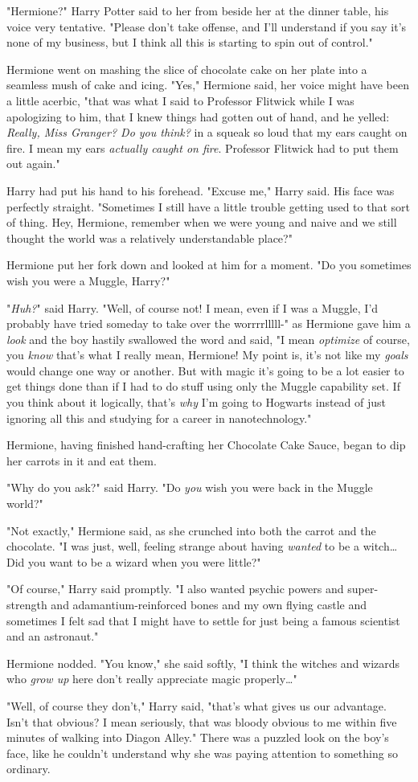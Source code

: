 "Hermione?" Harry Potter said to her from beside her at the dinner table, his 
voice very tentative. "Please don't take offense, and I'll understand if you 
say it's none of my business, but I think all this is starting to spin out of 
control."

Hermione went on mashing the slice of chocolate cake on her plate into a 
seamless mush of cake and icing. "Yes," Hermione said, her voice might have 
been a little acerbic, "that was what I said to Professor Flitwick while I was 
apologizing to him, that I knew things had gotten out of hand, and he yelled: 
\emph{Really, Miss Granger? Do you think?} in a squeak so loud that my ears 
caught on fire. I mean my ears \emph{actually caught on fire}. Professor 
Flitwick had to put them out again."

Harry had put his hand to his forehead. "Excuse me," Harry said. His face was 
perfectly straight. "Sometimes I still have a little trouble getting used to 
that sort of thing. Hey, Hermione, remember when we were young and naive and we 
still thought the world was a relatively understandable place?"

Hermione put her fork down and looked at him for a moment. "Do you sometimes 
wish you were a Muggle, Harry?"

"\emph{Huh?}" said Harry. "Well, of course not! I mean, even if I was a Muggle, 
I'd probably have tried someday to take over the worrrrlllll-" as Hermione gave 
him a \emph{look} and the boy hastily swallowed the word and said, "I mean 
\emph{optimize} of course, you \emph{know} that's what I really mean, Hermione! 
My point is, it's not like my \emph{goals} would change one way or another. But 
with magic it's going to be a lot easier to get things done than if I had to do 
stuff using only the Muggle capability set. If you think about it logically, 
that's \emph{why} I'm going to Hogwarts instead of just ignoring all this and 
studying for a career in nanotechnology."

Hermione, having finished hand-crafting her Chocolate Cake Sauce, began to dip 
her carrots in it and eat them.

"Why do you ask?" said Harry. "Do \emph{you} wish you were back in the Muggle 
world?"

"Not exactly," Hermione said, as she crunched into both the carrot and the 
chocolate. "I was just, well, feeling strange about having \emph{wanted} to be 
a witch{\ldots} Did you want to be a wizard when you were little?"

"Of course," Harry said promptly. "I also wanted psychic powers and 
super-strength and adamantium-reinforced bones and my own flying castle and 
sometimes I felt sad that I might have to settle for just being a famous 
scientist and an astronaut."

Hermione nodded. "You know," she said softly, "I think the witches and wizards 
who \emph{grow up} here don't really appreciate magic properly{\ldots}"

"Well, of course they don't," Harry said, "that's what gives us our advantage. 
Isn't that obvious? I mean seriously, that was bloody obvious to me within five 
minutes of walking into Diagon Alley." There was a puzzled look on the boy's 
face, like he couldn't understand why she was paying attention to something so 
ordinary.
